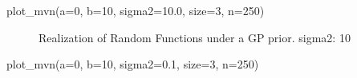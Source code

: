 \documentclass[
  letterpaper,
  DIV=11,
  numbers=noendperiod]{scrreprt}
\newenvironment{Shaded}{\begin{snugshade}}{\end{snugshade}}
\newcommand{\DecValTok}[1]{\textcolor[rgb]{0.68,0.00,0.00}{#1}}
\newcommand{\FloatTok}[1]{\textcolor[rgb]{0.68,0.00,0.00}{#1}}
\newcommand{\NormalTok}[1]{\textcolor[rgb]{0.00,0.23,0.31}{#1}}
\newcommand{\OperatorTok}[1]{\textcolor[rgb]{0.37,0.37,0.37}{#1}}
\begin{document}
\begin{Shaded}
\begin{Highlighting}[]
\NormalTok{plot\_mvn(a}\OperatorTok{=}\DecValTok{0}\NormalTok{, b}\OperatorTok{=}\DecValTok{10}\NormalTok{, sigma2}\OperatorTok{=}\FloatTok{10.0}\NormalTok{, size}\OperatorTok{=}\DecValTok{3}\NormalTok{, n}\OperatorTok{=}\DecValTok{250}\NormalTok{)}
\end{Highlighting}
\end{Shaded}

\begin{figure}[H]


\caption{\label{fig-mvn2}Realization of Random Functions under a GP
prior. sigma2: 10}

\end{figure}%

\begin{Shaded}
\begin{Highlighting}[]
\NormalTok{plot\_mvn(a}\OperatorTok{=}\DecValTok{0}\NormalTok{, b}\OperatorTok{=}\DecValTok{10}\NormalTok{, sigma2}\OperatorTok{=}\FloatTok{0.1}\NormalTok{, size}\OperatorTok{=}\DecValTok{3}\NormalTok{, n}\OperatorTok{=}\DecValTok{250}\NormalTok{)}
\end{Highlighting}
\end{Shaded}
\end{document}
